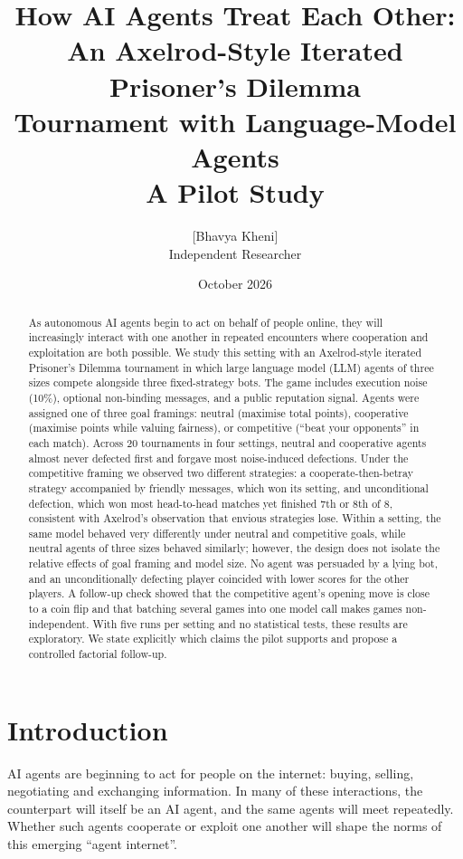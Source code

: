 \documentclass[11pt,a4paper]{article}
\title{\textbf{How AI Agents Treat Each Other:}\\[2pt]
\Large An Axelrod-Style Iterated Prisoner's Dilemma\\ Tournament with Language-Model Agents\\[4pt]
\large A Pilot Study}
\author{[Bhavya Kheni]\\ \small Independent Researcher}
\date{October 2026}
\begin{document}
\maketitle

\begin{abstract}
\noindent
As autonomous AI agents begin to act on behalf of people online, they will increasingly interact with one another in repeated encounters where cooperation and exploitation are both possible. We study this setting with an Axelrod-style iterated Prisoner's Dilemma tournament in which large language model (LLM) agents of three sizes compete alongside three fixed-strategy bots. The game includes execution noise (10\%), optional non-binding messages, and a public reputation signal. Agents were assigned one of three goal framings: neutral (maximise total points), cooperative (maximise points while valuing fairness), or competitive (``beat your opponents'' in each match). Across 20 tournaments in four settings, neutral and cooperative agents almost never defected first and forgave most noise-induced defections. Under the competitive framing we observed two different strategies: a cooperate-then-betray strategy accompanied by friendly messages, which won its setting, and unconditional defection, which won most head-to-head matches yet finished 7th or 8th of 8, consistent with Axelrod's observation that envious strategies lose. Within a setting, the same model behaved very differently under neutral and competitive goals, while neutral agents of three sizes behaved similarly; however, the design does not isolate the relative effects of goal framing and model size. No agent was persuaded by a lying bot, and an unconditionally defecting player coincided with lower scores for the other players. A follow-up check showed that the competitive agent's opening move is close to a coin flip and that batching several games into one model call makes games non-independent. With five runs per setting and no statistical tests, these results are exploratory. We state explicitly which claims the pilot supports and propose a controlled factorial follow-up.
\end{abstract}

\section{Introduction}

AI agents are beginning to act for people on the internet: buying, selling, negotiating and exchanging information. In many of these interactions, the counterpart will itself be an AI agent, and the same agents will meet repeatedly. Whether such agents cooperate or exploit one another will shape the norms of this emerging ``agent internet''.
\end{document}
